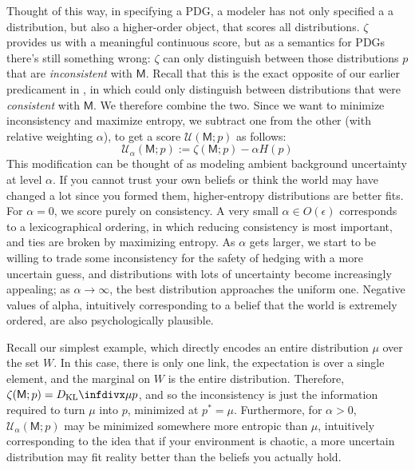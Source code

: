 \documentclass{article}
\newcommand{\sfM}{\mathsf M}
\newcommand{\MN}{PDG}
\newcommand{\MNs}{\MN s}
\numberwithin{equation}{section}
\begin{document}
	Thought of this way, in specifying a \MN, a modeler has not only specified a a distribution, but also a higher-order object, that scores all distributions. 
	$\zeta$ provides us with a meaningful continuous score, but as a semantics for \MNs\, there's still something wrong: $\zeta$ can only distinguish between those distributions $p$ that are \emph{inconsistent} with $\sfM$. 
	Recall that this is the exact opposite of our earlier predicament in , in which could only distinguish between distributions that were \emph{consistent} with $\sfM$. We therefore combine the two. Since we want to minimize inconsistency and maximize entropy, we subtract one from the other (with relative weighting $\alpha$), to get a score $\mathcal U(\sfM; p)$ as follows:
	\begin{equation}
		\mathcal U_\alpha(\sfM; p) := \zeta(\sfM;p) - \alpha H(p) \label{eq:freeenergy-weighted}
	\end{equation} 
	This modification can be thought of as modeling ambient background uncertainty at level $\alpha$. 
	If you cannot trust your own beliefs or think the world may have changed a lot since you formed them, higher-entropy distributions are better fits.	
	For $\alpha = 0$, we score purely on consistency. A very small $\alpha \in O(\epsilon)$ corresponds to a lexicographical ordering, in which reducing consistency is most important, and ties are broken by maximizing entropy. 
	As $\alpha$ gets larger, we start to be willing to trade some inconsistency for the safety of hedging with a more uncertain guess, and distributions with lots of uncertainty become increasingly appealing; as $\alpha \to \infty$, the best distribution approaches the uniform one. Negative values of alpha, intuitively corresponding to a belief that the world is extremely ordered, are also psychologically plausible. 
	
	

	
	\begin{example}[continues=ex:worldsonly]
		Recall our simplest example, which directly encodes an entire distribution $\mu$ over the set $W$. 
		In this case, there is only one link, the expectation is over a single element, and the marginal on $W$ is the entire distribution. Therefore, $\zeta(\sfM; p) = \kldiv{\mu}{p}$, and so the inconsistency is just the information required to turn $\mu$ into $p$, minimized at $p^* = \mu$. Furthermore, for $\alpha > 0$, $\mathcal U_\alpha (\sfM; p)$ may be minimized somewhere more entropic than $\mu$, intuitively corresponding to the idea that if your environment is chaotic, a more uncertain distribution may fit reality better than the beliefs you actually hold.
	\end{example}
		
\end{document}
